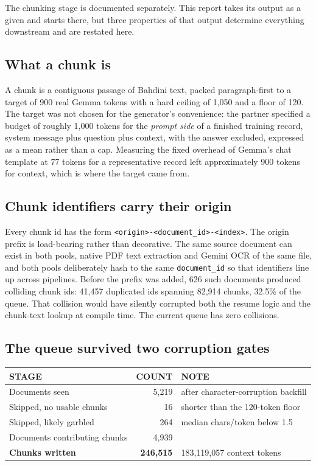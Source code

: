 \documentclass[10pt,a4paper]{article}
\newcommand{\codeid}[1]{\texttt{\footnotesize\color{inksoft}#1}}
\newcommand{\tablehead}[1]{{\uimed\fontsize{6.8}{8}\selectfont\color{crail}\mbox{#1}}}
\begin{document}
The chunking stage is documented separately. This report takes its output as a
given and starts there, but three properties of that output determine
everything downstream and are restated here.

\subsection{What a chunk is}

A chunk is a contiguous passage of Bahdini text, packed paragraph-first to a
target of 900 real Gemma tokens with a hard ceiling of 1,050 and a floor of
120. The target was not chosen for the generator's convenience: the partner
specified a budget of roughly 1,000 tokens for the \emph{prompt side} of a
finished training record, system message plus question plus context, with
the answer excluded, expressed as a mean rather than a cap. Measuring the
fixed overhead of Gemma's chat template at 77 tokens for a representative
record left approximately 900 tokens for context, which is where the target
came from.

\subsection{Chunk identifiers carry their origin}

Every chunk id has the form \codeid{<origin>-<document\_id>-<index>}. The
origin prefix is load-bearing rather than decorative. The same source document
can exist in both pools, native PDF text extraction and Gemini OCR of the
same file, and both pools deliberately hash to the same
\codeid{document\_id} so that identifiers line up across pipelines. Before the
prefix was added, 626 such documents produced colliding chunk ids: 41,457
duplicated ids spanning 82,914 chunks, 32.5\% of the queue. That collision
would have silently corrupted both the resume logic and the chunk-text lookup
at compile time. The current queue has zero collisions.

\subsection{The queue survived two corruption gates}

\begin{tabularx}{\textwidth}{@{}p{6.2cm}rL@{}}
\tablehead{STAGE} & \tablehead{COUNT} & \tablehead{NOTE}\\
\midrule
Documents seen & 5,219 & after character-corruption backfill\\
Skipped, no usable chunks & 16 & shorter than the 120-token floor\\
Skipped, likely garbled & 264 & median chars/token below 1.5\\
Documents contributing chunks & 4,939 & \\
\textbf{Chunks written} & \textbf{246,515} & 183,119,057 context tokens\\
\bottomrule
\end{tabularx}
\end{document}
